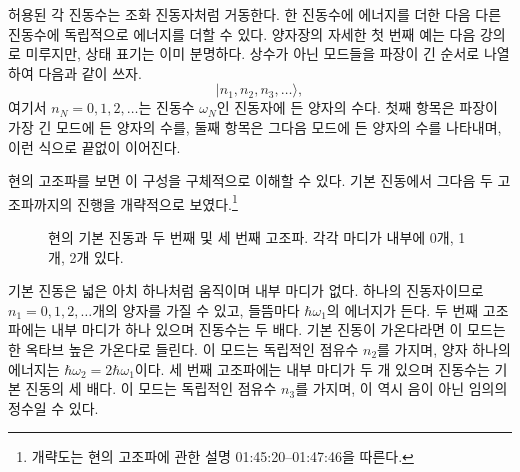 허용된 각 진동수는 조화 진동자처럼 거동한다. 한 진동수에 에너지를 더한 다음 다른 진동수에 독립적으로 에너지를 더할 수 있다. 양자장의 자세한 첫 번째 예는 다음 강의로 미루지만, 상태 표기는 이미 분명하다. 상수가 아닌 모드들을 파장이 긴 순서로 나열하여 다음과 같이 쓰자. \begin{equation}
|n_1,n_2,n_3,\ldots\rangle,
\end{equation} 여기서 \(n_N=0,1,2,\ldots\)는 진동수 \(\omega_N\)인 진동자에 든 양자의 수다. 첫째 항목은 파장이 가장 긴 모드에 든 양자의 수를, 둘째 항목은 그다음 모드에 든 양자의 수를 나타내며, 이런 식으로 끝없이 이어진다.

현의 고조파를 보면 이 구성을 구체적으로 이해할 수 있다. 기본 진동에서 그다음 두 고조파까지의 진행을 개략적으로 보였다.\footnote{개략도는 현의 고조파에 관한 설명 01:45:20--01:47:46을 따른다.}

\begin{figure}[t]\centering
{}\caption{현의 기본 진동과 두 번째 및 세 번째 고조파. 각각 마디가 내부에 0개, 1개, 2개 있다.}\end{figure}

기본 진동은 넓은 아치 하나처럼 움직이며 내부 마디가 없다. 하나의 진동자이므로 \(n_1=0,1,2,\ldots\)개의 양자를 가질 수 있고, 들뜸마다 \(\hbar\omega_1\)의 에너지가 든다. 두 번째 고조파에는 내부 마디가 하나 있으며 진동수는 두 배다. 기본 진동이 가온다라면 이 모드는 한 옥타브 높은 가온다로 들린다. 이 모드는 독립적인 점유수 \(n_2\)를 가지며, 양자 하나의 에너지는 \(\hbar\omega_2=2\hbar\omega_1\)이다. 세 번째 고조파에는 내부 마디가 두 개 있으며 진동수는 기본 진동의 세 배다. 이 모드는 독립적인 점유수 \(n_3\)를 가지며, 이 역시 음이 아닌 임의의 정수일 수 있다.

